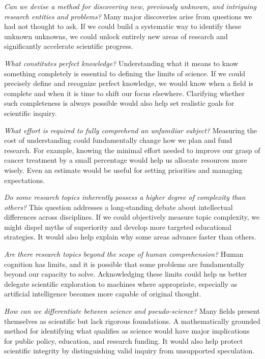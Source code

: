 \emph{Can we devise a method for discovering new, previously unknown, and intriguing research entities and problems?} Many major discoveries arise from questions we had not thought to ask. If we could build a systematic way to identify these unknown unknowns, we could unlock entirely new areas of research and significantly accelerate scientific progress.

\emph{What constitutes perfect knowledge?} Understanding what it means to know something completely is essential to defining the limits of science. If we could precisely define and recognize perfect knowledge, we would know when a field is complete and when it is time to shift our focus elsewhere. Clarifying whether such completeness is always possible would also help set realistic goals for scientific inquiry.

\emph{What effort is required to fully comprehend an unfamiliar subject?} Measuring the cost of understanding could fundamentally change how we plan and fund research. For example, knowing the minimal effort needed to improve our grasp of cancer treatment by a small percentage would help us allocate resources more wisely. Even an estimate would be useful for setting priorities and managing expectations.

\emph{Do some research topics inherently possess a higher degree of complexity than others?} This question addresses a long-standing debate about intellectual differences across disciplines. If we could objectively measure topic complexity, we might dispel myths of superiority and develop more targeted educational strategies. It would also help explain why some areas advance faster than others.

\emph{Are there research topics beyond the scope of human comprehension?} Human cognition has limits, and it is possible that some problems are fundamentally beyond our capacity to solve. Acknowledging these limits could help us better delegate scientific exploration to machines where appropriate, especially as artificial intelligence becomes more capable of original thought.

\emph{How can we differentiate between science and pseudo-science?} Many fields present themselves as scientific but lack rigorous foundations. A mathematically grounded method for identifying what qualifies as science would have major implications for public policy, education, and research funding. It would also help protect scientific integrity by distinguishing valid inquiry from unsupported speculation.


